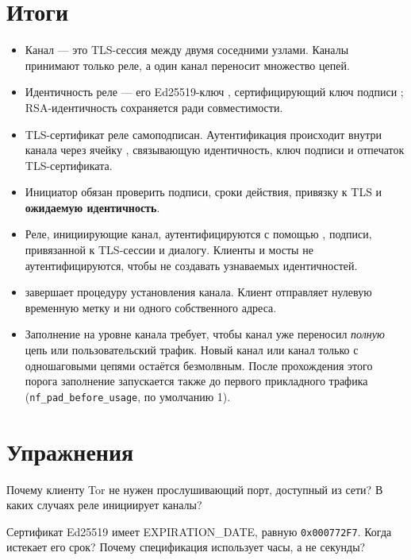 \section*{Итоги}
\begin{itemize}
  \item Канал --- это TLS-сессия между двумя соседними узлами. Каналы принимают только реле, а один канал переносит множество цепей.
  \item Идентичность реле --- его Ed25519-ключ , сертифицирующий ключ подписи ; RSA-идентичность сохраняется ради совместимости.
  \item TLS-сертификат реле самоподписан. Аутентификация происходит внутри канала через ячейку , связывающую идентичность, ключ подписи и отпечаток TLS-сертификата.
  \item Инициатор обязан проверить подписи, сроки действия, привязку к TLS и \textbf{ожидаемую идентичность}.
  \item Реле, инициирующие канал, аутентифицируются с помощью , подписи, привязанной к TLS-сессии и диалогу. Клиенты и мосты не аутентифицируются, чтобы не создавать узнаваемых идентичностей.
  \item {} завершает процедуру установления канала. Клиент отправляет нулевую временную метку и ни одного собственного адреса.
  \item Заполнение на уровне канала требует, чтобы канал уже переносил \emph{полную} цепь или пользовательский трафик. Новый канал или канал только с одношаговыми цепями остаётся безмолвным. После прохождения этого порога заполнение запускается также до первого прикладного трафика (\texttt{nf\_pad\_before\_usage}, по умолчанию 1).
\end{itemize}

\section*{Упражнения}

\begin{esercizio}[1]\label{es:07-ruoli}
Почему клиенту Tor не нужен прослушивающий порт, доступный из сети? В каких случаях реле инициирует каналы?
\end{esercizio}

\begin{esercizio}[1]\label{es:07-scadenza}
Сертификат Ed25519 имеет EXPIRATION\_DATE, равную \texttt{0x000772F7}. Когда истекает его срок? Почему спецификация использует часы, а не секунды?
\end{esercizio}

